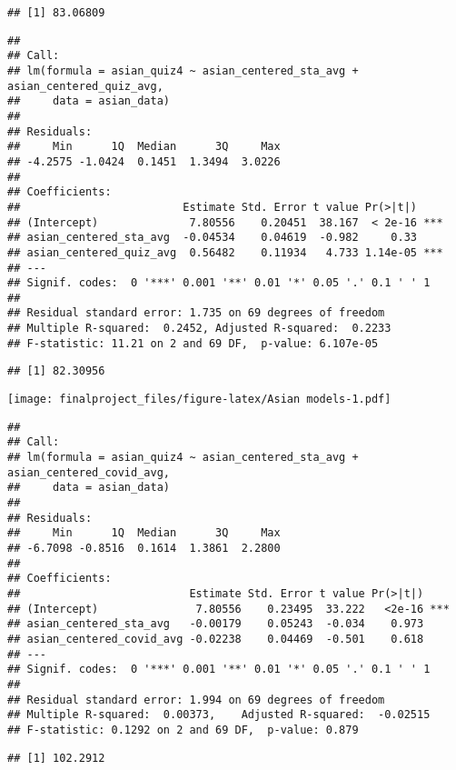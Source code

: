 \documentclass[
]{article}
\begin{document}
\begin{verbatim}
## [1] 83.06809
\end{verbatim}

\begin{verbatim}
## 
## Call:
## lm(formula = asian_quiz4 ~ asian_centered_sta_avg + asian_centered_quiz_avg, 
##     data = asian_data)
## 
## Residuals:
##     Min      1Q  Median      3Q     Max 
## -4.2575 -1.0424  0.1451  1.3494  3.0226 
## 
## Coefficients:
##                         Estimate Std. Error t value Pr(>|t|)    
## (Intercept)              7.80556    0.20451  38.167  < 2e-16 ***
## asian_centered_sta_avg  -0.04534    0.04619  -0.982     0.33    
## asian_centered_quiz_avg  0.56482    0.11934   4.733 1.14e-05 ***
## ---
## Signif. codes:  0 '***' 0.001 '**' 0.01 '*' 0.05 '.' 0.1 ' ' 1
## 
## Residual standard error: 1.735 on 69 degrees of freedom
## Multiple R-squared:  0.2452, Adjusted R-squared:  0.2233 
## F-statistic: 11.21 on 2 and 69 DF,  p-value: 6.107e-05
\end{verbatim}

\begin{verbatim}
## [1] 82.30956
\end{verbatim}

\texttt{[image: finalproject\_files/figure-latex/Asian models-1.pdf]}

\begin{verbatim}
## 
## Call:
## lm(formula = asian_quiz4 ~ asian_centered_sta_avg + asian_centered_covid_avg, 
##     data = asian_data)
## 
## Residuals:
##     Min      1Q  Median      3Q     Max 
## -6.7098 -0.8516  0.1614  1.3861  2.2800 
## 
## Coefficients:
##                          Estimate Std. Error t value Pr(>|t|)    
## (Intercept)               7.80556    0.23495  33.222   <2e-16 ***
## asian_centered_sta_avg   -0.00179    0.05243  -0.034    0.973    
## asian_centered_covid_avg -0.02238    0.04469  -0.501    0.618    
## ---
## Signif. codes:  0 '***' 0.001 '**' 0.01 '*' 0.05 '.' 0.1 ' ' 1
## 
## Residual standard error: 1.994 on 69 degrees of freedom
## Multiple R-squared:  0.00373,    Adjusted R-squared:  -0.02515 
## F-statistic: 0.1292 on 2 and 69 DF,  p-value: 0.879
\end{verbatim}

\begin{verbatim}
## [1] 102.2912
\end{verbatim}
\end{document}
